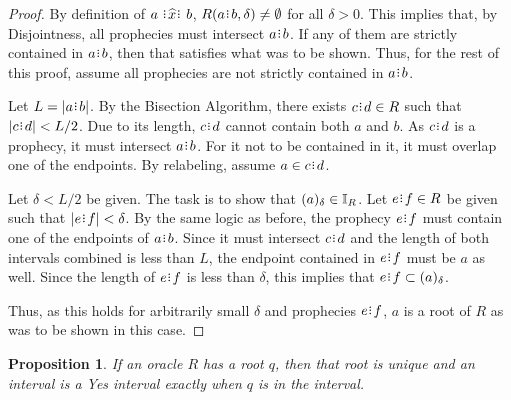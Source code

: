 \documentclass[12pt]{article}
\newtheorem{proposition}{Proposition}[section]
\begin{document}
\begin{proof}
    By definition of $a \xora b$, $R(a\rint b, \delta) \neq \emptyset$ for all $\delta > 0$. This implies that, by Disjointness, all prophecies must intersect $a\rint b$. If any of them are strictly contained in $a\rint b$, then that satisfies what was to be shown. Thus, for the rest of this proof, assume all prophecies are not strictly contained in $a\rint b$.

    Let $L = |a\rint b|$. By the Bisection Algorithm, there exists $c\rint d \in R$ such that $|c\rint d| < L/2$. Due to its length, $c\rint d$ cannot contain both $a$ and $b$. As $c\rint d$ is a prophecy, it must intersect $a\rint b$. For it not to be contained in it, it must overlap one of the endpoints. By relabeling, assume $a \in c\rint d$.
    
    Let $\delta < L/2$ be given. The task is to show that $(a)_{\delta} \in \mathbb{I}_R$. Let $e\rint f \in R$ be given such that $|e\rint f| < \delta$. By the same logic as before, the prophecy $e\rint f$ must contain one of the endpoints of $a\rint b$. Since it must intersect $c\rint d$ and the length of both intervals combined is less than $L$, the endpoint contained in $e\rint f$ must be $a$ as well. Since the length of $e\rint f$ is less than $\delta$, this implies that $e\rint f \subset \halo{a}$.

    Thus, as this holds for arbitrarily small $\delta$ and prophecies $e\rint f$, $a$ is a root of $R$ as was to be shown in this case. 
\end{proof}

\begin{proposition}\label{os-singular}
    If an oracle $R$ has a root $q$, then that root is unique and an interval is a Yes interval exactly when $q$ is in the interval.
\end{proposition}
\end{document}
